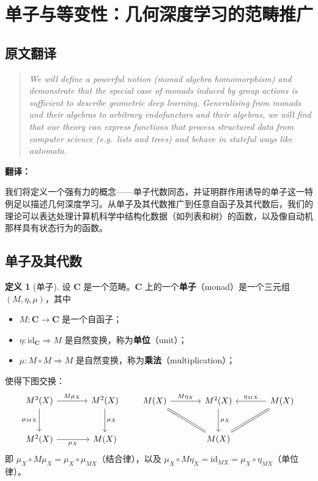 \documentclass[12pt,a4paper]{ctexart}
\theoremstyle{definition}
\newtheorem{definition}{定义}[section]
\newcommand{\cat}[1]{\mathbf{#1}}
\newcommand{\id}{\mathrm{id}}
\begin{document}
\newpage

\section{单子与等变性：几何深度学习的范畴推广}

\subsection{原文翻译}

\begin{quote}
\itshape
We will define a powerful notion (monad algebra homomorphism) and demonstrate that the special case of monads induced by group actions is sufficient to describe geometric deep learning. Generalising from monads and their algebras to arbitrary endofunctors and their algebras, we will find that our theory can express functions that process structured data from computer science (e.g.\ lists and trees) and behave in stateful ways like automata.
\end{quote}

\textbf{翻译：}

我们将定义一个强有力的概念——单子代数同态，并证明群作用诱导的单子这一特例足以描述几何深度学习。从单子及其代数推广到任意自函子及其代数后，我们的理论可以表达处理计算机科学中结构化数据（如列表和树）的函数，以及像自动机那样具有状态行为的函数。

\subsection{单子及其代数}

\begin{definition}[单子]\label{def:monad}
设 $\cat C$ 是一个范畴。$\cat C$ 上的一个\textbf{单子}（monad）是一个三元组 $(M,\eta,\mu)$，其中
\begin{itemize}[nosep]
    \item $M:\cat C\to\cat C$ 是一个自函子；
    \item $\eta:\id_{\cat C}\Rightarrow M$ 是自然变换，称为\textbf{单位}（unit）；
    \item $\mu:M\circ M\Rightarrow M$ 是自然变换，称为\textbf{乘法}（multiplication）；
\end{itemize}
使得下图交换：
\[
\begin{tikzcd}[column sep=large, row sep=large]
M^3(X) \arrow[r,"M\mu_X"] \arrow[d,"\mu_{MX}"'] & M^2(X) \arrow[d,"\mu_X"] \\
M^2(X) \arrow[r,"\mu_X"'] & M(X)
\end{tikzcd}
\qquad
\begin{tikzcd}[column sep=large, row sep=large]
M(X) \arrow[r,"M\eta_X"] \arrow[dr,equal] & M^2(X) \arrow[d,"\mu_X"] & M(X) \arrow[l,"\eta_{MX}"'] \arrow[dl,equal] \\
& M(X) &
\end{tikzcd}
\]
即 $\mu_X\circ M\mu_X=\mu_X\circ\mu_{MX}$（结合律），以及 $\mu_X\circ M\eta_X=\id_{MX}=\mu_X\circ\eta_{MX}$（单位律）。
\end{definition}
\end{document}

